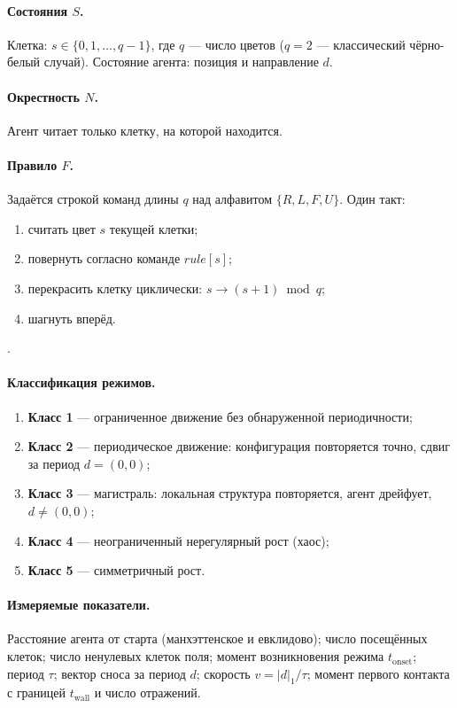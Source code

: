 \documentclass[12pt,a4paper]{article}
\begin{document}
	\paragraph{Состояния $S$.} Клетка: $s\in\{0,1,\dots,q-1\}$, где $q$ --- число цветов ($q=2$ --- классический чёрно-белый случай). Состояние агента: позиция и направление $d$.
	
	\paragraph{Окрестность $N$.} Агент читает только клетку, на которой находится.
	
	\paragraph{Правило $F$.} Задаётся строкой команд длины $q$ над алфавитом
	$\{R,L,F,U\}$. Один такт:
	\begin{enumerate}
		\item считать цвет $s$ текущей клетки;
		\item повернуть согласно команде $rule[s]$;
		\item перекрасить клетку циклически: $s \to (s+1)\bmod q$;
		\item шагнуть вперёд.
	\end{enumerate}
.
	
	\paragraph{Классификация режимов.}
	\begin{enumerate}
		\item \textbf{Класс 1} --- ограниченное движение без обнаруженной периодичности;
		\item \textbf{Класс 2} --- периодическое движение: конфигурация повторяется точно, сдвиг за период $d=(0,0)$;
		\item \textbf{Класс 3} --- магистраль: локальная структура повторяется, агент дрейфует, $d\neq(0,0)$;
		\item \textbf{Класс 4} --- неограниченный нерегулярный рост (хаос);
		\item \textbf{Класс 5} --- симметричный рост.
	\end{enumerate}
	
	\paragraph{Измеряемые показатели.} Расстояние агента от старта (манхэттенское и евклидово); число посещённых клеток; число ненулевых клеток поля; момент возникновения режима $t_{\mathrm{onset}}$; период $\tau$; вектор сноса за период $d$; скорость $v=|d|_1/\tau$; момент первого контакта с границей $t_{\mathrm{wall}}$ и число отражений.
	
\end{document}
